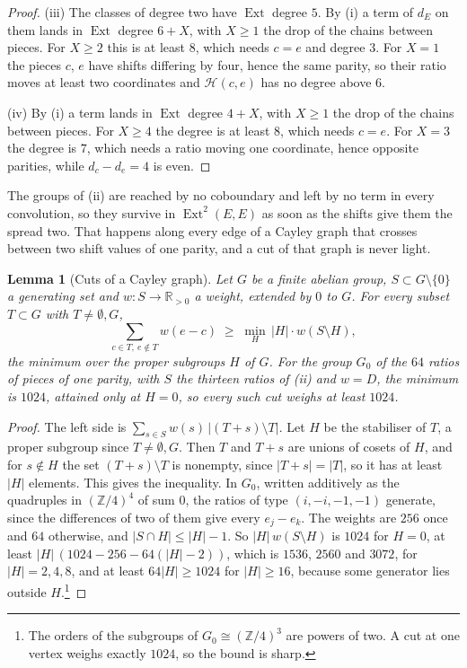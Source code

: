 \documentclass[11pt,reqno]{amsart}
\theoremstyle{plain}
\newtheorem{lemma}[theorem]{Lemma}
\theoremstyle{definition}
\theoremstyle{remark}
\newcommand{\ZZ}{\mathbb{Z}}
\newcommand{\RR}{\mathbb{R}}
\newcommand{\cH}{\mathcal{H}}
\DeclareMathOperator{\Ext}{Ext}
\begin{document}
\begin{proof}
(iii) The classes of degree two have $\Ext$ degree $5$. By (i) a term of $d_{E}$ on them lands
in $\Ext$ degree $6+X$, with $X\ge1$ the drop of the chains between pieces.
For $X\ge2$ this is at least $8$, which needs $c=e$ and degree $3$. For $X=1$
the pieces $c$, $e$ have shifts differing by four, hence the same parity, so
their ratio moves at least two coordinates and $\cH(c,e)$ has no degree above
$6$.

(iv) By (i) a term lands in $\Ext$ degree $4+X$, with $X\ge1$ the drop of the
chains between pieces. For $X\ge4$ the degree is at least $8$, which needs
$c=e$. For $X=3$ the degree is $7$, which needs a ratio moving one
coordinate, hence opposite parities, while $d_{c}-d_{e}=4$ is even.
\end{proof}

The groups of (ii) are reached by no coboundary and left by no term in every
convolution, so they survive in $\Ext^{2}(E,E)$ as soon as the shifts give
them the spread two. That happens along every edge of a Cayley graph that
crosses between two shift values of one parity, and a cut of that graph is
never light.

\begin{lemma}[Cuts of a Cayley graph]\label{lem:cayleycut}
Let $G$ be a finite abelian group, $S\subset G\setminus\{0\}$ a generating
set and $w\colon S\to\RR_{>0}$ a weight, extended by $0$ to $G$. For every
subset $T\subset G$ with $T\ne\emptyset,G$,
\[
  \sum_{c\in T,\ e\notin T}w(e-c)\;\ge\;\min_{H}\,|H|\cdot w(S\setminus H),
\]
the minimum over the proper subgroups $H$ of $G$. For the group $G_{0}$ of
the $64$ ratios of pieces of one parity, with $S$ the thirteen ratios of
(ii) and $w=D$, the minimum is $1024$, attained only at
$H=0$, so every such cut weighs at least $1024$.
\end{lemma}

\begin{proof}
The left side is $\sum_{s\in S}w(s)\,|(T+s)\setminus T|$. Let $H$ be the
stabiliser of $T$, a proper subgroup since $T\ne\emptyset,G$. Then $T$ and
$T+s$ are unions of cosets of $H$, and for $s\notin H$ the set
$(T+s)\setminus T$ is nonempty, since $|T+s|=|T|$, so it has at least $|H|$
elements. This gives the inequality. In $G_{0}$, written additively as the
quadruples in $(\ZZ/4)^{4}$ of sum $0$, the ratios of type $(i,-i,-1,-1)$
generate, since the differences of two of them give every $e_{j}-e_{k}$. The
weights are $256$ once and $64$ otherwise, and $|S\cap H|\le|H|-1$. So
$|H|\,w(S\setminus H)$ is $1024$ for $H=0$, at least
$|H|\,(1024-256-64(|H|-2))$, which is $1536$, $2560$ and $3072$, for
$|H|=2,4,8$, and at least $64|H|\ge1024$ for $|H|\ge16$, because some
generator lies outside $H$.\footnote{The orders of the subgroups of
$G_{0}\cong(\ZZ/4)^{3}$ are powers of two. A cut at one vertex weighs exactly
$1024$, so the bound is sharp.}
\end{proof}
\end{document}
